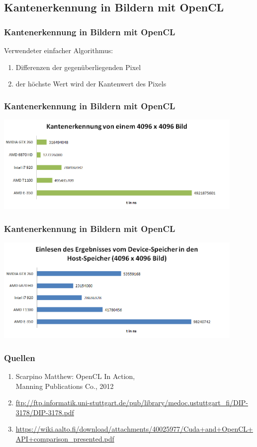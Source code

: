\documentclass{beamer}
\begin{document}
\subsection{Kantenerkennung in Bildern mit OpenCL}
\begin{frame}
\frametitle{Kantenerkennung in Bildern mit OpenCL}
Verwendeter einfacher Algorithmus:
\begin{enumerate}
\item Differenzen der gegenüberliegenden Pixel
\item der höchste Wert wird der Kantenwert des Pixels
\end{enumerate}
\end{frame}

\begin{frame}
\frametitle{Kantenerkennung in Bildern mit OpenCL}
\begin{center}
\includegraphics[width=12cm]{edge_detection_benchmark.PNG}
\end{center}
\end{frame}

\begin{frame}
\frametitle{Kantenerkennung in Bildern mit OpenCL}
\begin{center}
\includegraphics[width=12cm]{device_to_host_mem_benchmark.PNG}
\end{center}
\end{frame}

\begin{appendix}
\begin{frame}
\frametitle{Quellen}
\begin{enumerate}
\item Scarpino Matthew: OpenCL In Action, \\Manning Publications Co., 2012
\item \url{ftp://ftp.informatik.uni-stuttgart.de/pub/library/medoc.ustuttgart_fi/DIP-3178/DIP-3178.pdf}
\item \url{https://wiki.aalto.fi/download/attachments/40025977/Cuda+and+OpenCL+API+comparison_presented.pdf}
\end{enumerate}
\end{frame}
\end{appendix}
\end{document}
